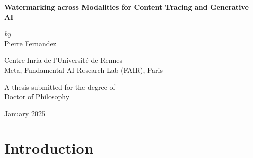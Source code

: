 \documentclass{these-dbl}
\begin{document}


\begin{titlepage}
    \begin{center}
        \vspace*{1cm}

        \Huge
        \textbf{Watermarking across Modalities for Content Tracing and Generative AI} 

        \vspace{1cm}
        \large
        \textit{by} \\
        \Large
        Pierre Fernandez

        \vspace*{3cm}

        \hspace{1.5cm}

        \vspace*{0.8cm}

        \Large
        Centre Inria de l'Université de Rennes  \\
        Meta, Fundamental AI Research Lab (FAIR), Paris 

        \vspace{3cm}

        \large
        A thesis submitted for the degree of \\
        Doctor of Philosophy 

        \vspace{0.8cm}
        \large
        January 2025

    \end{center}
\end{titlepage}



\clearpage
{}
\renewcommand{\contentsname}{Table of Contents}
\setcounter{tocdepth}{1}
\tableofcontents %
\restoregeometry 

\clearpage 


\clearpage \part{Introduction}\label{part:introduction}
\end{document}
